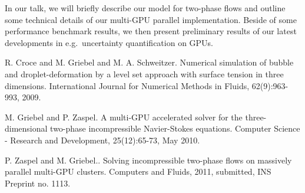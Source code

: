 In our talk, we will briefly describe our model for two-phase flows and outline
some technical details of our multi-GPU parallel implementation. Beside of some
performance benchmark results, we then present preliminary results of our
latest developments in e.g.~uncertainty quantification on GPUs.


\begin{thebibliography}{10}

{\sc  R. Croce and M. Griebel and M. A. Schweitzer}. {Numerical simulation of bubble and droplet-deformation by a level set approach with surface tension in three dimensions}.  International Journal for Numerical Methods in Fluids, 62(9):963-993, 2009.



{\sc  M. Griebel and P. Zaspel}. {A multi-GPU accelerated solver for the three-dimensional two-phase incompressible Navier-Stokes equations}. Computer Science - Research and Development, 25(12):65-73, May 2010.



{\sc P. Zaspel and M. Griebel.}. {Solving incompressible two-phase flows on massively parallel multi-GPU clusters}. Computers and Fluids, 2011, submitted, INS Preprint no. 1113.

\end{thebibliography}
